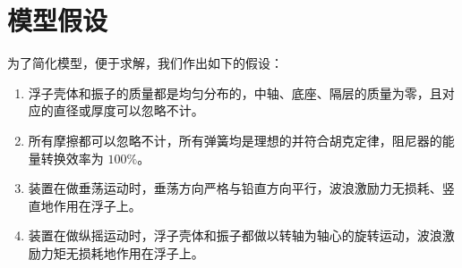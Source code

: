 \section{模型假设}

为了简化模型，便于求解，我们作出如下的假设：

\begin{enumerate}
    \item 浮子壳体和振子的质量都是均匀分布的，中轴、底座、隔层的质量为零，且对应的直径或厚度可以忽略不计。
    \item 所有摩擦都可以忽略不计，所有弹簧均是理想的并符合胡克定律，阻尼器的能量转换效率为 $100\%$。
    \item 装置在做垂荡运动时，垂荡方向严格与铅直方向平行，波浪激励力无损耗、竖直地作用在浮子上。
    \item 装置在做纵摇运动时，浮子壳体和振子都做以转轴为轴心的旋转运动，波浪激励力矩无损耗地作用在浮子上。
\end{enumerate}